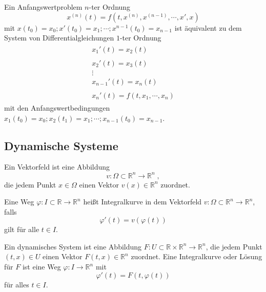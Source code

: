 \begin{Satz}
Ein Anfangswertproblem $n$-ter Ordnung
 $$ x^{(n)}(t) = f(t, x^{(n)}, x^{(n-1)} , \cdots , x', x) $$ mit  $x(t_0) = x_0 ; x'(t_0) = x_1; \cdots ; x^{n-1}(t_{0})= x_{n-1}  $ ist äquivalent zu dem System von   Differentialgleichungen $1$-ter Ordnung
\begin{align*}
\begin{matrix} x_1'(t) = x_2(t) \\  \\ x_2'(t) = x_3(t) \\  \vdots \\  x_{n-1}'(t) = x_n(t) \\ \\ x_n'(t) = f(t, x_1, \cdots, x_n )\end{matrix}
\end{align*}
mit den Anfangswertbedingungen  $x_1(t_0) = x_0 ; x_2(t_1) = x_1; \cdots ; x_{n-1}(t_{0})= x_{n-1} $.
\end{Satz}

\subsection{Dynamische Systeme}

\begin{Definition}[Vektorfeld]
Ein Vektorfeld ist eine Abbildung $$v : \Omega \subset \mathbb{R}^n \to \mathbb{R}^n \; ,$$ die jedem Punkt $x  \in \Omega$ einen Vektor $v(x) \in \mathbb{R}^n$ zuordnet.
\end{Definition}

\begin{Definition}
Eine Weg $\varphi : I \subset \mathbb{R} \to \mathbb{R}^n$ heißt Integralkurve in dem Vektorfeld $v : \Omega \subset \mathbb{R}^n \to \mathbb{R}^n$, falls 
$$\varphi' (t) = v(\varphi(t))$$ gilt für alle $t \in  I$.
\end{Definition}

\begin{Definition}
Ein dynamisches System ist eine  Abbildung $F : U \subset \mathbb{R} \times \mathbb{R}^n \to \mathbb{R}^n$, die jedem Punkt $(t,x)  \in U$ einen Vektor $F(t,x) \in \mathbb{R}^n$ zuordnet. Eine Integralkurve oder Lösung für $F$ ist eine Weg $\varphi : I \to \mathbb{R}^n$ mit 
$$\varphi'(t) = F(t, \varphi(t)) $$
für alles $t \in I$.
\end{Definition}


\begin{Satz}
\end{Satz}

